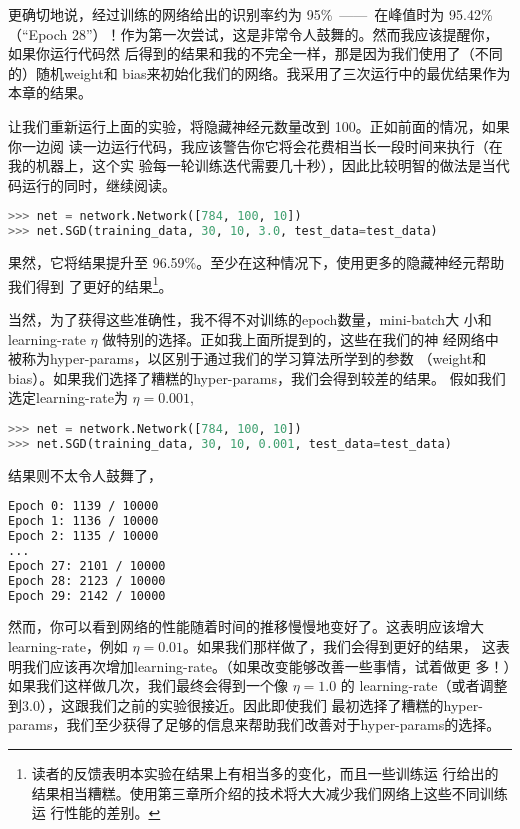 更确切地说，经过训练的网络给出的识别率约为 95\%~——~在峰值时为 95.42\%（“Epoch
  28”）！作为第一次尝试，这是非常令人鼓舞的。然而我应该提醒你，如果你运行代码然
后得到的结果和我的不完全一样，那是因为我们使用了（不同的）随机\gls*{weight}和
\gls*{bias}来初始化我们的网络。我采用了三次运行中的最优结果作为本章的结果。

让我们重新运行上面的实验，将隐藏神经元数量改到 100。正如前面的情况，如果你一边阅
读一边运行代码，我应该警告你它将会花费相当长一段时间来执行（在我的机器上，这个实
  验每一轮训练迭代需要几十秒），因此比较明智的做法是当代码运行的同时，继续阅读。

\begin{lstlisting}[language=Python]
>>> net = network.Network([784, 100, 10])
>>> net.SGD(training_data, 30, 10, 3.0, test_data=test_data)
\end{lstlisting}

果然，它将结果提升至 96.59\%。至少在这种情况下，使用更多的隐藏神经元帮助我们得到
了更好的结果\footnote{读者的反馈表明本实验在结果上有相当多的变化，而且一些训练运
  行给出的结果相当糟糕。使用第三章所介绍的技术将大大减少我们网络上这些不同训练运
  行性能的差别。}。

当然，为了获得这些准确性，我不得不对训练的\gls*{epoch}数量，\gls*{mini-batch}大
小和\gls*{learning-rate} $\eta$ 做特别的选择。正如我上面所提到的，这些在我们的神
经网络中被称为\gls*{hyper-params}，以区别于通过我们的学习算法所学到的参数
（\gls*{weight}和\gls*{bias}）。如果我们选择了糟糕的\gls*{hyper-params}，我们会得到较差的结果。
假如我们选定\gls*{learning-rate}为 $\eta = 0.001$,

\begin{lstlisting}[language=Python]
>>> net = network.Network([784, 100, 10])
>>> net.SGD(training_data, 30, 10, 0.001, test_data=test_data)
\end{lstlisting}

结果则不太令人鼓舞了，

\begin{lstlisting}[language=sh]
Epoch 0: 1139 / 10000
Epoch 1: 1136 / 10000
Epoch 2: 1135 / 10000
...
Epoch 27: 2101 / 10000
Epoch 28: 2123 / 10000
Epoch 29: 2142 / 10000
\end{lstlisting}

然而，你可以看到网络的性能随着时间的推移慢慢地变好了。这表明应该增大
\gls*{learning-rate}，例如 $\eta = 0.01$。如果我们那样做了，我们会得到更好的结果，
这表明我们应该再次增加\gls*{learning-rate}。（如果改变能够改善一些事情，试着做更
  多！）如果我们这样做几次，我们最终会得到一个像 $\eta = 1.0$ 的%
\gls*{learning-rate}（或者调整到$3.0$），这跟我们之前的实验很接近。因此即使我们
最初选择了糟糕的\gls*{hyper-params}，我们至少获得了足够的信息来帮助我们改善对于\gls*{hyper-params}的选择。


